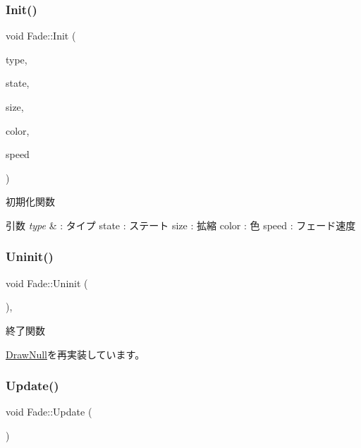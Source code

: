\subsubsection{\texorpdfstring{Init()}{Init()}}
{\footnotesize\ttfamily void Fade\+::\+Init (\begin{DoxyParamCaption}\item[{\mbox{\hyperlink{class_fade_ac06f27215b454aa05b93c236476d6e80}{Type}}}]{type,  }\item[{\mbox{\hyperlink{class_fade_ae77826bf3ff2ab95fb7b3b6f95cba80a}{State}}}]{state,  }\item[{\mbox{\hyperlink{_vector3_d_8h_a5ef6e95dfc5f9d3820b71772d99bbc25}{Vec2}}}]{size,  }\item[{\mbox{\hyperlink{_vector3_d_8h_a680c30c4a07d86fe763c7e01169cd6cc}{X\+Color4}}}]{color,  }\item[{float}]{speed }\end{DoxyParamCaption})}



初期化関数 


\begin{DoxyParams}{引数}
{\em type} & \+: タイプ state \+: ステート size \+: 拡縮 color \+: 色 speed \+: フェード速度 \\
\hline
\end{DoxyParams}
\mbox{\label{class_fade_ae77d06811869d3c8162a42c3e0e14f7f}} 
\subsubsection{\texorpdfstring{Uninit()}{Uninit()}}
{\footnotesize\ttfamily void Fade\+::\+Uninit (\begin{DoxyParamCaption}{ }\end{DoxyParamCaption})\hspace{0.3cm}{\ttfamily [override]}, {\ttfamily [virtual]}}



終了関数 



\mbox{\hyperlink{class_draw_null_a12d44e341c7364b5ab9cdd661dc16187}{Draw\+Null}}を再実装しています。

\mbox{\label{class_fade_a1579b5b9020344a1131ea11c15f2c0bd}} 
\subsubsection{\texorpdfstring{Update()}{Update()}}
{\footnotesize\ttfamily void Fade\+::\+Update (\begin{DoxyParamCaption}{ }\end{DoxyParamCaption})\hspace{0.3cm}{\ttfamily [virtual]}}



